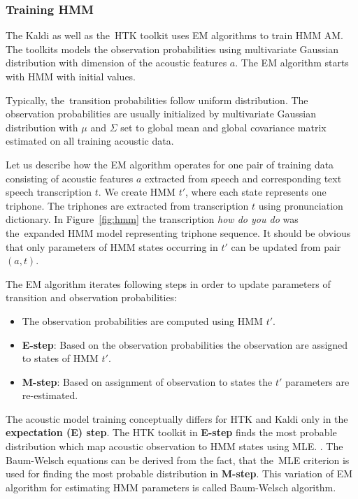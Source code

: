 {\subsubsection*{Training \ac{HMM}}
\label{sub:trainhmm}

The Kaldi as well as the~\ac{HTK} toolkit uses \acl{EM} algorithms to train \ac{HMM} \acl{AM}.
The toolkits models the observation probabilities using multivariate Gaussian distribution 
with dimension of the acoustic features $a$.
The \ac{EM} algorithm starts with \ac{HMM} with initial values. 

Typically, the~transition probabilities follow uniform distribution.
The observation probabilities are usually initialized by multivariate Gaussian distribution
with $\mu$ and $\Sigma$ set to global mean and global covariance matrix 
estimated on all training acoustic data.

Let us describe how the \ac{EM} algorithm operates for one pair
of training data consisting of acoustic features $a$ extracted from speech
and corresponding text speech transcription $t$.
We create \ac{HMM} $t'$, where each state represents one triphone. 
The triphones are extracted from transcription $t$ using pronunciation dictionary.
In Figure~\ref{fig:hmm} the transcription {\it how do you do}\/ 
was the~expanded \ac{HMM} model representing triphone sequence.
It should be obvious that only parameters of HMM states 
occurring in $t'$ can be updated from pair $(a, t)$.

The \ac{EM} algorithm iterates following steps in order 
to update parameters of transition and observation probabilities:
\begin{itemize}
    \item The observation probabilities are computed using \ac{HMM} $t'$. 
    \item {\bf E-step}: Based on the observation probabilities the observation are assigned to states of \ac{HMM} $t'$. 
    \item {\bf M-step}: Based on assignment of observation to states the $t'$ parameters are re-estimated. 
\end{itemize}

The acoustic model training conceptually differs for \ac{HTK} and Kaldi only in the {\bf expectation (E) step}.
The \ac{HTK} toolkit in {\bf E-step} finds the most probable distribution 
which map acoustic observation to \ac{HMM} states using \ac{MLE}. . 
The Baum-Welsch equations can be derived from the fact, 
that the~\ac{MLE} criterion is used for finding the most probable distribution in {\bf M-step}.\cite{huang2001spoken}
This variation of \ac{EM} algorithm for estimating \ac{HMM} parameters is called Baum-Welsch algorithm.

}
